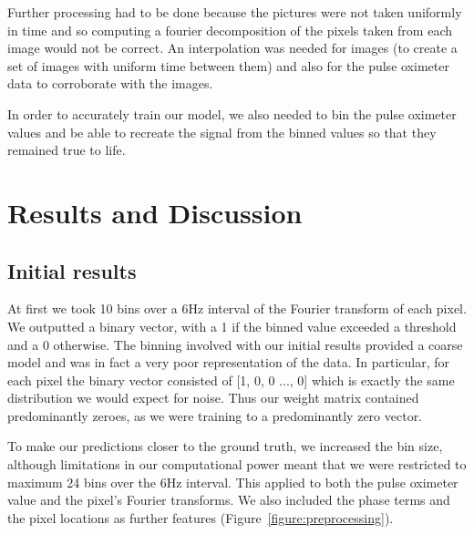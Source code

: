 \documentclass[12pt]{article}
\begin{document}
  Further processing had to be done because the pictures were not taken uniformly in time and so computing a fourier decomposition of the pixels taken from each image would not be correct.
  An interpolation was needed for images (to create a set of images with uniform time between them) and also for the pulse oximeter data to corroborate with the images.

  In order to accurately train our model, we also needed to bin the pulse oximeter values and be able to recreate the signal from the binned values so that they remained true to life.
  
  


\section{Results and Discussion}
 \subsection*{Initial results}
  At first we took 10 bins over a 6Hz interval of the Fourier transform of each pixel. We outputted a binary vector, with a 1 if the binned value exceeded a threshold and a 0 otherwise. The binning involved with our initial results provided a coarse model and was in fact a very poor representation of the data. In particular, for each pixel the binary vector consisted of [1, 0, 0 ..., 0] which is exactly the same distribution we would expect for noise. Thus our weight matrix contained predominantly zeroes, as we were training to a predominantly zero vector.

  To make our predictions closer to the ground truth, we increased the bin size, although limitations in our computational power meant that we were restricted to maximum 24 bins over the 6Hz interval. This applied to both the pulse oximeter value and the pixel's Fourier transforms. We also included the phase terms and the pixel locations as further features (Figure~\ref{figure:preprocessing}).
\end{document}
